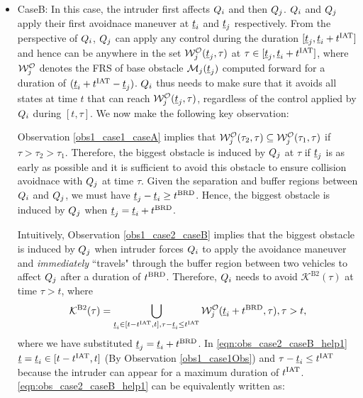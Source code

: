 \begin{itemize}[leftmargin=*]
\item \label{sec:intruderObs_case2_caseB} CaseB: In this case, the intruder first affects $Q_i$ and then $Q_j$. $Q_i$ and $Q_j$ apply their first avoidnace maneuver at $\underline{t}_i$ and $\underline{t}_j$ respectively. From the perspective  of $Q_i$, $Q_j$ can apply any control during the duration $[\underline{t}_j, \underline{t}_i + t^\text{IAT}]$ and hence can be anywhere in the set $\mathcal{W}_{j}^{\mathcal{O}}(\underline{t}_j, \tau)$ at $\tau \in [\underline{t}_j, \underline{t}_i + t^\text{IAT}]$, where $\mathcal{W}_{j}^{\mathcal{O}}$ denotes the FRS of base obstacle $\mathcal{M}_j(\underline{t}_j)$ computed forward for a duration of $(\underline{t}_i + t^\text{IAT} - \underline{t}_j)$. $Q_i$ thus needs to make sure that it avoids all states at time $t$ that can reach $\mathcal{W}_{j}^{\mathcal{O}}(\underline{t}_j, \tau)$, regardless of the control applied by $Q_i$ during $[t, \tau]$. We now make the following key observation:
\begin{observation} \label{obs1_case2_caseB}
Observation \ref{obs1_case1_caseA} implies that $\mathcal{W}_{j}^{\mathcal{O}}(\tau_2, \tau) \subseteq \mathcal{W}_{j}^{\mathcal{O}}(\tau_1, \tau)$ if $\tau > \tau_2 > \tau_1$. Therefore, the biggest obstacle is induced by $Q_j$ at $\tau$ if $\underline{t}_j$ is as early as possible and it is sufficient to avoid this obstacle to ensure collision avoidnace with $Q_j$ at time $\tau$. Given the separation and buffer regions between $Q_i$ and $Q_j$, we must have $\underline{t}_j - \underline{t}_i \geq t^\text{BRD}$. Hence, the biggest obstacle is induced by $Q_j$ when $\underline{t}_j = \underline{t}_i + t^\text{BRD}$. 
\end{observation}
Intuitively, Observation \ref{obs1_case2_caseB} implies that the biggest obstacle is induced by $Q_j$ when intruder forces $Q_i$ to apply the avoidance maneuver and \textit{immediately} ``travels" through the buffer region between two vehicles to affect $Q_j$ after a duration of $t^\text{BRD}$. Therefore, $Q_i$ needs to avoid $\mathcal{K}^{\text{B2}}(\tau)$ at time $\tau > t$, where 
\begin{equation} \label{eqn:obs_case2_caseB_help1}
\mathcal{K}^{\text{B2}}(\tau) =  \bigcup_{\tsa_i \in [t-\iat, t], \tau - \tsa_i \leq \iat} \frs_{j}^{\mathcal{O}}(\tsa_i + \brd, \tau), \tau>t,
\end{equation}
where we have substituted $\underline{t}_j = \underline{t}_i + t^\text{BRD}$. In \eqref{eqn:obs_case2_caseB_help1} $\underline{t} = \underline{t}_i \in [t-t^\text{IAT}, t]$ (By Observation \ref{obs1_case1Obs}) and $\tau - \underline{t}_i \leq t^\text{IAT}$ because the intruder can appear for a maximum duration of $t^\text{IAT}$. \eqref{eqn:obs_case2_caseB_help1} can be equivalently written as:  
\begin{equation} \label{eqn:obs_case2_caseB_help1}

\end{equation}
\end{itemize}
